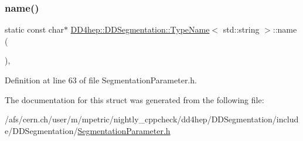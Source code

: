 \subsubsection{\texorpdfstring{name()}{name()}}
{\footnotesize\ttfamily static const char$\ast$ \hyperlink{struct_d_d4hep_1_1_d_d_segmentation_1_1_type_name}{D\+D4hep\+::\+D\+D\+Segmentation\+::\+Type\+Name}$<$ std\+::string $>$\+::name (\begin{DoxyParamCaption}{ }\end{DoxyParamCaption})\hspace{0.3cm}{\ttfamily [inline]}, {\ttfamily [static]}}



Definition at line 63 of file Segmentation\+Parameter.\+h.



The documentation for this struct was generated from the following file\+:\begin{DoxyCompactItemize}
\item 
/afs/cern.\+ch/user/m/mpetric/nightly\+\_\+cppcheck/dd4hep/\+D\+D\+Segmentation/include/\+D\+D\+Segmentation/\hyperlink{_segmentation_parameter_8h}{Segmentation\+Parameter.\+h}\end{DoxyCompactItemize}
